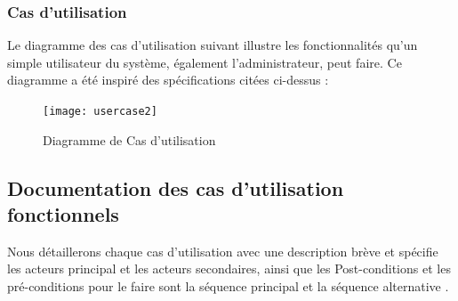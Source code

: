  \subsubsection{ Cas d’utilisation }
 Le diagramme des cas d’utilisation suivant illustre les fonctionnalités qu’un simple utilisateur du système, également l’administrateur, peut faire. Ce diagramme a été inspiré des spécifications citées ci-dessus :
 
 \begin{figure}[H]
 	\centering
 	\texttt{[image: usercase2]}
 	\caption{Diagramme de Cas d’utilisation}
 	\label{fig:usercase2}
 \end{figure}
 
 \subsection{ Documentation des cas d’utilisation fonctionnels }
Nous détaillerons chaque cas d'utilisation avec une description  brève et spécifie  les acteurs principal et les acteurs secondaires, ainsi que les Post-conditions  et les pré-conditions  pour le faire sont la séquence principal et la séquence alternative .

